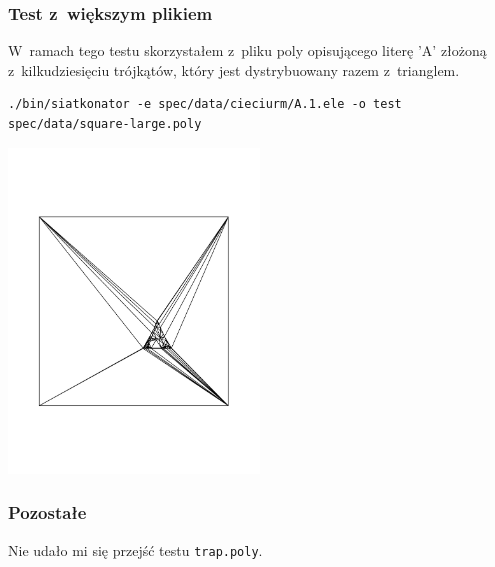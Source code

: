 \documentclass[a4paper]{article} \usepackage{setspace}
\begin{document}
\subsubsection{Test z~większym plikiem}
W~ramach tego testu skorzystałem z~pliku poly opisującego literę 'A' złożoną z~kilkudziesięciu trójkątów, który jest dystrybuowany razem z~trianglem.
\begin{lstlisting}
./bin/siatkonator -e spec/data/cieciurm/A.1.ele -o test spec/data/square-large.poly
\end{lstlisting}
\includegraphics[width=0.5\textwidth]{litera_a.pdf}

\subsubsection{Pozostałe}
Nie udało mi się przejść testu \texttt{trap.poly}.
\end{document}
